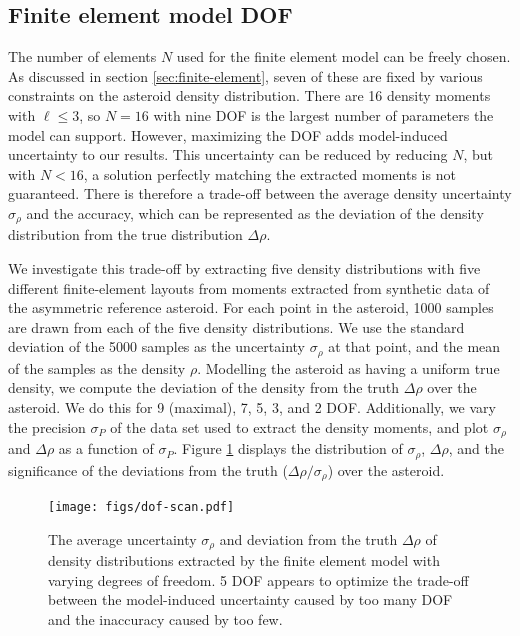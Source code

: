 \documentclass[fleqn,usenatbib]{mnras}
\begin{document}
\subsection{Finite element model DOF}
\label{sec:dof-scan}
The number of elements $N$ used for the finite element model can be freely chosen. As discussed in section \ref{sec:finite-element}, seven of these are fixed by various constraints on the asteroid density distribution. There are 16 density moments with $\ell \leq 3$, so $N=16$ with nine DOF is the largest number of parameters the model can support. However, maximizing the DOF adds model-induced uncertainty to our results. This uncertainty can be reduced by reducing $N$, but with $N < 16$, a solution perfectly matching the extracted moments is not guaranteed. There is therefore a trade-off between the average density uncertainty $\sigma_\rho$ and the accuracy, which can be represented as the deviation of the density distribution from the true distribution $\Delta \rho$.

We investigate this trade-off by extracting five density distributions with five different finite-element layouts from moments extracted from synthetic data of the asymmetric reference asteroid. For each point in the asteroid, 1000 samples are drawn from each of the five density distributions. We use the standard deviation of the 5000 samples as the uncertainty $\sigma_\rho$ at that point, and the mean of the samples as the density $\rho$. Modelling the asteroid as having a uniform true density, we compute the deviation of the density from the truth $\Delta \rho$ over the asteroid. We do this for 9 (maximal), 7, 5, 3, and 2 DOF. Additionally, we vary the precision $\sigma_P$ of the data set used to extract the density moments, and plot $\sigma_\rho$ and $\Delta \rho$ as a function of $\sigma_P$. Figure \ref{fig:dof-scan} displays the distribution of $\sigma_\rho$, $\Delta \rho$, and the significance of the deviations from the truth ($\Delta \rho / \sigma_\rho$) over the asteroid.

\begin{figure}
  \texttt{[image: figs/dof-scan.pdf]}
  \caption{The average uncertainty $\sigma_\rho$ and deviation from the truth $\Delta \rho$ of density distributions extracted by the finite element model with varying degrees of freedom. 5 DOF appears to optimize the trade-off between the model-induced uncertainty caused by too many DOF and the inaccuracy caused by too few.}
  \label{fig:dof-scan}
\end{figure}
\end{document}
